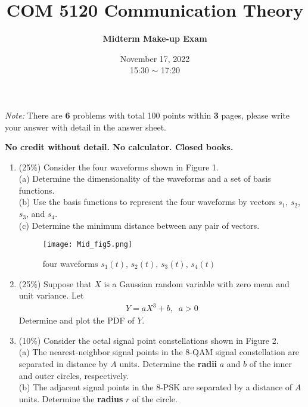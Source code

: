 \documentclass[a4paper,12pt]{article}
\title{\textbf{COM 5120 Communication Theory}}
\author{\textbf{Midterm Make-up Exam}}
\date{November 17, 2022 \\ 
15:30 $\sim$ 17:20
}
\begin{document}
    \maketitle
    \textit{Note: }There are \textbf{6} problems with total 100 points within \textbf{3} pages, please write your answer with detail in the answer sheet.

    {\bf No credit without detail.  No calculator. Closed books.}

    \begin{enumerate}
        \item (25\%) 
            Consider the four waveforms shown in Figure 1. \\ 
            (a) Determine the dimensionality of the waveforms and a set of basis functions. \\
            (b)  Use the basis functions to represent the four waveforms by vectors $s_1$, $s_2$, $s_3$, and $s_4$. \\
            (c) Determine the minimum distance between any pair of vectors.
            \begin{figure}[h]
            	\centering
            	\texttt{[image: Mid\_fig5.png]}
            	\caption{four waveforms $s_1(t)$, $s_2(t)$, $s_3(t)$, $s_4(t)$}
            \end{figure}
        \item (25\%) 
            Suppose that $X$ is a Gaussian random variable with zero mean and unit variance. Let
            \begin{align*}
                Y = aX^3 + b, \;\; a > 0
            \end{align*}
            Determine and plot the PDF of $Y$. \\ 
        \item (10\%) 
            Consider the octal signal point constellations shown in Figure 2. \\ 
            (a) The nearest-neighbor signal points in the 8-QAM signal constellation are separated in distance by $A$ units. Determine the \textbf{radii} $a$ and $b$ of the inner and outer circles, respectively. \\
            (b) The adjacent signal points in the 8-PSK are separated by a distance of $A$ units. Determine the \textbf{radius} $r$ of the circle. \\

\end{enumerate}
\end{document}
